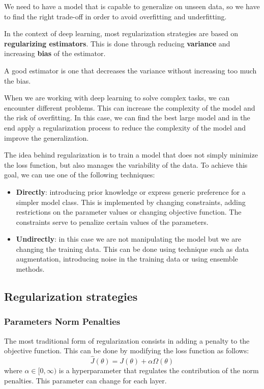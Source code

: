We need to have a model that is capable to generalize on unseen data, so we have
to find the right trade-off in order to avoid overfitting and underfitting.

In the context of deep learning, most regularization strategies are based on
\textbf{regularizing estimators}. This is done through reducing \textbf{variance}
and increasing \textbf{bias} of the estimator.
\begin{note}
    A good estimator is one that decreases the variance without increasing too
    much the bias.
\end{note}

When we are working with deep learning to solve complex tasks, we can encounter
different problems. This can increase the complexity of the model and the risk of
overfitting. In this case, we can find the best large model and in the end apply
a regularization process to reduce the complexity of the model and improve the
generalization.

The idea behind regularization is to train a model that does not simply minimize
the loss function, but also manages the variability of the data. To achieve this
goal, we can use one of the following techniques:
\begin{itemize}
    \item \textbf{Directly}: introducing prior knowledge or express generic
          preference for a simpler model class. This is implemented by changing
          constraints, adding restrictions on the parameter values or changing
          objective function. The constraints serve to penalize certain values
          of the parameters.
    \item \textbf{Undirectly}: in this case we are not manipulating the model but
          we are changing the training data. This can be done using technique
          such as data augmentation, introducing noise in the training data or
          using ensemble methods.
\end{itemize}
\subsection{Regularization strategies}
\subsubsection{Parameters Norm Penalties}
The most traditional form of regularization consists in adding a penalty to the
objective function. This can be done by modifying the loss function as follows:
\begin{equation}
    \hat{J}(\theta) = J(\theta) + \alpha \Omega(\theta)
\end{equation}
where $\alpha \in [0, \infty)$ is a hyperparameter that regulates the contribution
of the norm penalties. This parameter can change for each layer.

